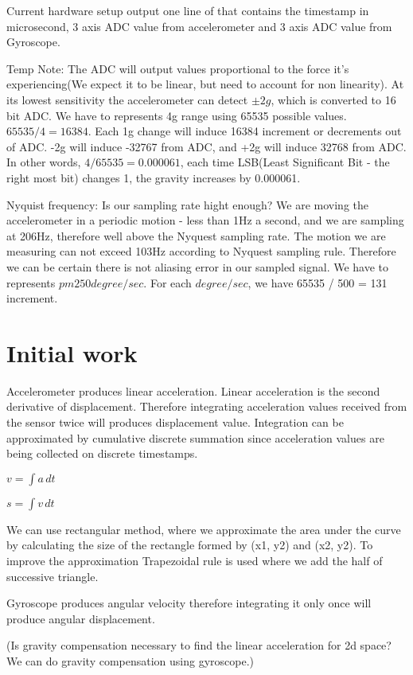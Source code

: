 \documentclass{article}
\begin{document}
Current hardware setup output one line of that contains the timestamp in microsecond, 3 axis ADC value from accelerometer and 3 axis ADC value from Gyroscope. 

Temp Note:
The ADC will output values proportional to the force it's experiencing(We expect it to be linear, but need to account for non linearity). At its lowest sensitivity the accelerometer can detect $\pm 2g$, which is converted to 16 bit ADC. We have to represents 4g range using 65535 possible values. $65535 / 4 = 16384$. Each 1g change will induce 16384 increment or decrements out of ADC. -2g will induce -32767 from ADC, and +2g will induce 32768 from ADC. In other words, $4 / 65535 = 0.000061$, each time LSB(Least Significant Bit - the right most bit) changes 1, the gravity increases by 0.000061.

Nyquist frequency: Is our sampling rate hight enough? We are moving the accelerometer in a periodic motion - less than 1Hz a second, and we are sampling at 206Hz, therefore well above the Nyquest sampling rate. The motion we are measuring can not exceed 103Hz according to Nyquest sampling rule. Therefore we can be certain there is not aliasing error in our sampled signal. We have to represents $pm 250 degree / sec$. For each $degree /sec$, we have 65535 / 500 = 131 increment.

\section{Initial work}

Accelerometer produces linear acceleration. Linear acceleration is the second derivative of displacement. Therefore integrating acceleration values received from the sensor twice will produces displacement value. Integration can be approximated by cumulative discrete summation since acceleration values are being collected on discrete timestamps. 

$v = \int a \,dt$

$s = \int v \,dt$

We can use rectangular method, where we approximate the area under the curve by calculating the size of the rectangle formed by (x1, y2) and (x2, y2). To improve the approximation Trapezoidal rule is used where we add the half of successive triangle.

Gyroscope produces angular velocity therefore integrating it only once will produce angular displacement.

(Is gravity compensation necessary to find the linear acceleration for 2d space? We can do gravity compensation using gyroscope.)
\end{document}
